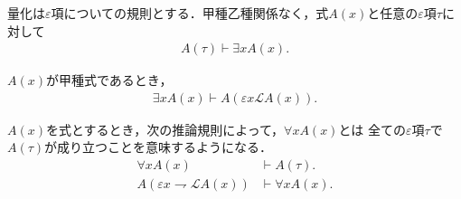 	量化は$\varepsilon$項についての規則とする．甲種乙種関係なく，式$A(x)$と任意の$\varepsilon$項$\tau$に対して
	\begin{align}
		A(\tau) \vdash \exists x A(x).
	\end{align}
	
	$A(x)$が甲種式であるとき，
	\begin{align}
		\exists x A(x) \vdash A\left(\varepsilon x \mathcal{L}A(x)\right).
	\end{align}
	
	$A(x)$を式とするとき，次の推論規則によって，$\forall x A(x)$とは
	全ての$\varepsilon$項$\tau$で$A(\tau)$が成り立つことを意味するようになる．
	\begin{align}
		\forall x A(x) &\vdash A(\tau). \\
		A(\varepsilon x \rightharpoondown \mathcal{L}A(x)) &\vdash \forall x A(x). 
	\end{align}
	